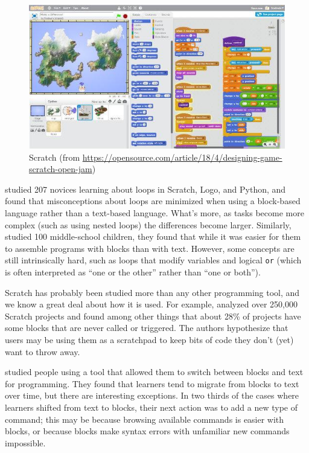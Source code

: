 \begin{figure}
\centering
\includegraphics{../docs/fig/scratch.jpg}
\caption{Scratch (from \url{https://opensource.com/article/18/4/designing-game-scratch-open-jam})}
\label{f:pck-scratch}
\end{figure}

\cite{Mlad2017} studied 207 novices learning about loops in Scratch,
Logo, and Python, and found that misconceptions about loops are
minimized when using a block-based language rather than a text-based
language.  What's more, as tasks become more complex (such as using
nested loops) the differences become larger.  Similarly,
\cite{Grov2017} studied 100 middle-school children, they found that
while it was easier for them to assemble programs with blocks than
with text.  However, some concepts are still intrinsically hard, such
as loops that modify variables and logical \texttt{or} (which is often
interpreted as ``one or the other'' rather than ``one or both'').

Scratch has probably been studied more than any other programming
tool, and we know a great deal about how it is used.  For example,
\cite{Aiva2016} analyzed over 250,000 Scratch projects and found among
other things that about 28\% of projects have some blocks that are
never called or triggered.  The authors hypothesize that users may be
using them as a scratchpad to keep bits of code they don't (yet) want
to throw away.

\cite{Wein2017a} studied people using a tool that allowed them to
switch between blocks and text for programming.  They found that
learners tend to migrate from blocks to text over time, but there are
interesting exceptions.  In two thirds of the cases where learners
shifted from text to blocks, their next action was to add a new type
of command; this may be because browsing available commands is easier
with blocks, or because blocks make syntax errors with unfamiliar new
commands impossible.

